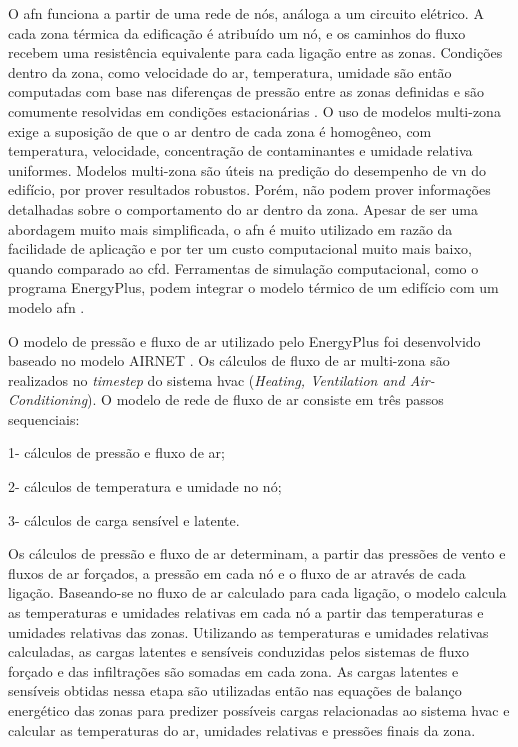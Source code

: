 O \acrshort{afn} funciona a partir de uma rede de nós, análoga a um circuito elétrico. A cada zona térmica da edificação é atribuído um nó, e os caminhos do fluxo recebem uma resistência equivalente para cada ligação entre as zonas.
Condições dentro da zona, como velocidade do ar, temperatura, umidade são então computadas com base nas diferenças de pressão entre as zonas definidas e são comumente resolvidas em condições estacionárias \cite{Omrani2017}.	
O uso de modelos multi-zona exige a suposição de que o ar dentro de cada zona é homogêneo, com temperatura, velocidade, concentração de contaminantes e umidade relativa uniformes. Modelos multi-zona são úteis na predição do desempenho de \acrshort{vn} do edifício, por prover resultados robustos. Porém, não podem prover informações detalhadas sobre o comportamento do ar dentro da zona. Apesar de ser uma abordagem muito mais simplificada, o \acrshort{afn} é muito utilizado em razão da facilidade de aplicação e por ter um custo computacional muito mais baixo, quando comparado ao \acrshort{cfd}. Ferramentas de simulação computacional, como o programa EnergyPlus, podem integrar o modelo térmico de um edifício com um modelo \acrshort{afn} \cite{Belleri2014}.

O modelo de pressão e fluxo de ar utilizado pelo EnergyPlus \cite{EnergyPlus2018} foi desenvolvido baseado no modelo AIRNET \cite{Walton1989}. Os cálculos de fluxo de ar multi-zona são realizados no \textit{timestep} do sistema \acrshort{hvac} (\textit{Heating, Ventilation and Air-Conditioning}). O modelo de rede de fluxo de ar consiste em três passos sequenciais:

1- cálculos de pressão e fluxo de ar;

2- cálculos de temperatura e umidade no nó;

3- cálculos de carga sensível e latente.

Os cálculos de pressão e fluxo de ar determinam, a partir das pressões de vento e fluxos de ar forçados, a pressão em cada nó e o fluxo de ar através de cada ligação. Baseando-se no fluxo de ar calculado para cada ligação, o modelo	calcula as temperaturas e umidades relativas em cada nó a partir das temperaturas e umidades relativas das zonas. 
Utilizando as temperaturas e umidades relativas calculadas, as cargas latentes e sensíveis conduzidas pelos	sistemas de fluxo forçado e das infiltrações são somadas em cada zona. As cargas latentes e sensíveis obtidas nessa etapa são utilizadas então nas equações de balanço energético das zonas para predizer possíveis cargas relacionadas ao sistema \acrshort{hvac} e calcular as temperaturas do ar, umidades relativas e pressões finais da zona.

